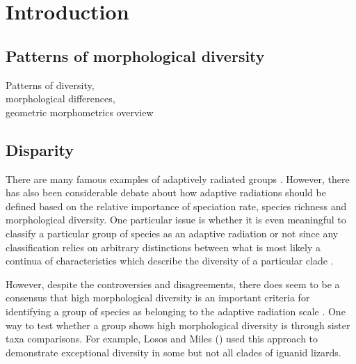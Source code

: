 \chapter{Introduction}
\label{chap:introduction}


\noindent


\section{Patterns of morphological diversity}
	Patterns of diversity, \\
	morphological differences, \\
	geometric morphometrics overview		


\section{Disparity}

	There are many famous examples of adaptively radiated groups \citep{Gavrilets2009}. However, there has also been considerable debate about how adaptive radiations should be defined \citep{Glor2010, Losos2010a} based on the relative importance of speciation rate, species richness and morphological diversity. One particular issue is whether it is even meaningful to classify a particular group of species as an adaptive radiation or not since any classification relies on arbitrary distinctions between what is most likely a continua of characteristics which describe the diversity of a particular clade \citep{Olson2009}.
	
	However, despite the controversies and disagreements, there does seem to be a consensus that high morphological diversity is an important criteria for identifying a group of species as belonging to the adaptive radiation scale \citep{Losos2010a, Olson2009}. One way to test whether a group shows high morphological diversity is through sister taxa comparisons. For example, Losos and Miles (\citeyear{Losos2002}) used this approach to demonstrate exceptional diversity in some but not all clades of iguanid lizards.

